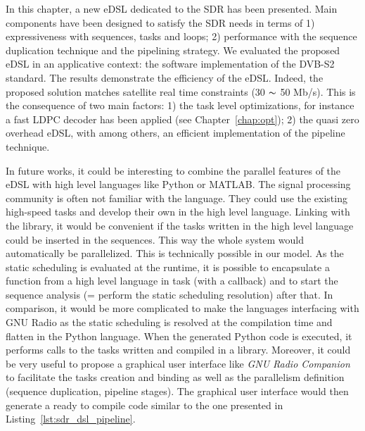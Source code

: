 In this chapter, a new eDSL dedicated to the SDR has been presented. Main
components have been designed to satisfy the SDR needs in terms of 1)
expressiveness with sequences, tasks and loops; 2) performance with the sequence
duplication technique and the pipelining strategy. We evaluated the proposed
eDSL in an applicative context: the software implementation of the DVB-S2
standard. The results demonstrate the efficiency of the \AFFECT eDSL. Indeed,
the proposed solution matches satellite real time constraints (30 $\thicksim$
50 Mb/s). This is the consequence of two main factors: 1) the task level
optimizations, for instance a fast LDPC decoder has been applied (see
Chapter~\ref{chap:opt}); 2) the quasi zero overhead eDSL, with among others, an
efficient implementation of the pipeline technique.

In future works, it could be interesting to combine the parallel features of the
\AFFECT eDSL with high level languages like Python or MATLAB\R. The signal
processing community is often not familiar with the \Cxx language. They could
use the existing high-speed \Cxx tasks and develop their own in the high level
language. Linking with the \AFFECT library, it would be convenient if the tasks
written in the high level language could be inserted in the \AFFECT sequences.
This way the whole system would automatically be parallelized. This is
technically possible in our model. As the static scheduling is evaluated at the
runtime, it is possible to encapsulate a function from a high level language in
\AFFECT task (with a callback) and to start the sequence analysis (= perform the
static scheduling resolution) after that. In comparison, it would be more
complicated to make the languages interfacing with GNU Radio as the static
scheduling is resolved at the compilation time and flatten in the Python
language. When the generated Python code is executed, it performs calls to the
tasks written and compiled in a \Cxx library. Moreover, it could be very useful
to propose a graphical user interface like \emph{GNU Radio Companion} to
facilitate the tasks creation and binding as well as the parallelism definition
(sequence duplication, pipeline stages). The graphical user interface would then
generate a ready to compile \Cxx code similar to the one presented in
Listing~\ref{lst:sdr_dsl_pipeline}.